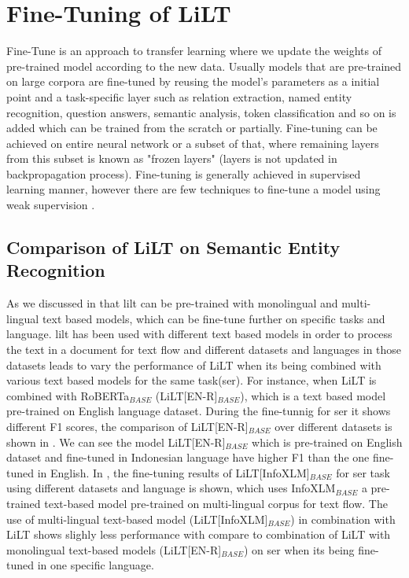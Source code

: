 
\section{Fine-Tuning of LiLT \label{section_fine_tune}}

Fine-Tune is an approach to transfer learning where we update the weights of pre-trained model according to the new data. Usually models that are pre-trained on large corpora are fine-tuned by reusing the model's parameters as a initial point and a task-specific layer such as relation extraction, named entity recognition, question answers, semantic analysis, token classification and so on is added which can be trained from the scratch or partially. Fine-tuning can be achieved on entire neural network or a subset of that, where remaining layers from this subset is known as "frozen layers" (layers is not updated in backpropagation process). Fine-tuning is generally achieved in supervised learning manner, however there are few techniques to fine-tune a model using weak supervision \cite{yu2020fine}.

\subsection{Comparison of LiLT on Semantic Entity Recognition}
 As we discussed in  that \acrshort{lilt} can be pre-trained with monolingual and multi-lingual text based models, which can be fine-tune further on specific tasks and language. \acrshort{lilt} has been used with different text based models in order to process the text in a document for text flow and different datasets and languages in those datasets leads to vary the performance of LiLT when its being combined with various text based models for the same task(\acrshort{ser}). For instance, when LiLT is combined with RoBERTa\(_{BASE}\) (LiLT[EN-R]\(_{BASE}\)), which is a text based model pre-trained on English language dataset. During the fine-tunnig for \acrfull{ser} it shows different F1 scores, the comparison of LiLT[EN-R]\(_{BASE}\) over different datasets is shown in . We can see the model LiLT[EN-R]\(_{BASE}\) which is pre-trained on English dataset and fine-tuned in Indonesian language have higher F1 than the one fine-tuned in English. In , the fine-tuning results of LiLT[InfoXLM]\(_{BASE}\) for \acrshort{ser} task using different datasets and language is shown,  which uses InfoXLM\(_{BASE}\) a pre-trained text-based model pre-trained on multi-lingual corpus for text flow.  The use of multi-lingual text-based model (LiLT[InfoXLM]\(_{BASE}\)) in combination with LiLT shows slighly less performance with compare to combination of LiLT with monolingual text-based models (LiLT[EN-R]\(_{BASE}\)) on \acrshort{ser} when its being fine-tuned in one specific language. 

